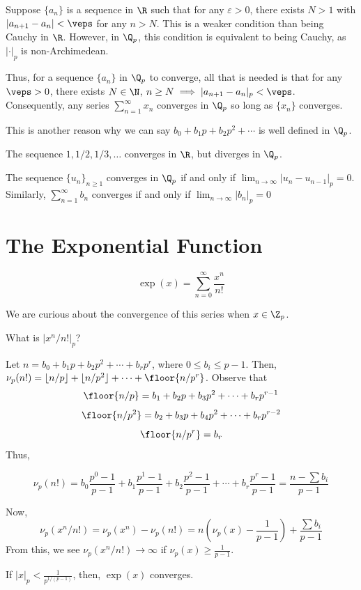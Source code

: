 \begin{rmk}
    Suppose $\{a_n\}$ is a sequence in $\R$ such that for any $\varepsilon>0$, there exists $N >1$ with $|a_{n+1}-a_n|<\veps$ for any $n> N$. This is a weaker condition than being Cauchy in $\R$. However, in $\Q_p$, this condition is equivalent to being Cauchy, as $|\cdot |_p$ is non-Archimedean.

    Thus, for a sequence $\{a_n\}$ in $\Q_p$ to converge, all that is needed is that for any $\veps >0$, there exists $N \in \N$, $n \geq N \implies |a_{n+1}-a_n|_p<\veps$. Consequently, any series $\sum_{n=1}^\infty x_n$ converges in $\Q_p$ so long as $\{x_n\}$ converges.

    This is another reason why we can say $b_0+b_1p+b_2p^2+\cdots$ is well defined in $\Q_p$.
\end{rmk}

\begin{ex}
    The sequence $1,1/2,1/3,\dots$ converges in $\R$, but diverges in $\Q_p$.
\end{ex}

\begin{prop}
    The sequence $\{u_n\}_{n \geq 1}$ converges in $\Q_p$ if and only if $\lim_{n \to \infty}|u_n-u_{n-1}|_p=0$. Similarly, $\sum_{n=1}^\infty b_n$ converges if and only if $\lim_{n \to \infty}|b_n|_p=0$
\end{prop}

\section{The Exponential Function}

\begin{notebox*}[Recall]
    $$\exp(x)=\sum_{n=0}^\infty \frac{x^n}{n!}$$
\end{notebox*}
We are curious about the convergence of this series when $x \in \Z_p$.

\begin{notebox*}[Question]
    What is $|x^n/n!|_p$?
\end{notebox*}

Let $n=b_0+b_1p+b_2p^2+\cdots +b_rp^r$, where $0 \leq b_i \le p-1$. Then, $\nu_p(n!)=\lfloor n/p\rfloor + \lfloor n /p^2\rfloor + \cdots + \floor{n/p^r}$. Observe that
$$\floor{n/p}=b_1+b_2p+b_3p^2+\cdots+b_rp^{r-1}$$
$$\floor{n/p^2}=b_2+b_3p+b_4p^2+\cdots +b_rp^{r-2}$$
$$\floor{n/p^r}=b_r$$
Thus,
\begin{prop}
    $$\nu_p(n!)=b_0\frac{p^0-1}{p-1}+b_1\frac{p^1-1}{p-1}+b_2\frac{p^2-1}{p-1}+\cdots +b_r\frac{p^r-1}{p-1}=\frac{n-\sum b_i}{p-1}$$
\end{prop}
Now,
$$\nu_p(x^n/n!)=\nu_p(x^n)-\nu_p(n!)=n(\nu_p(x) - \frac{1}{p-1})+\frac{\sum b_i}{p-1}$$
From this, we see $\nu_p(x^n/n!) \to \infty$ if $\nu_p(x) \geq \frac{1}{p-1}$.
\begin{prop}
    If $|x|_p < \frac{1}{p^{1/(p-1)}}$, then, $\exp(x)$ converges.
\end{prop}

